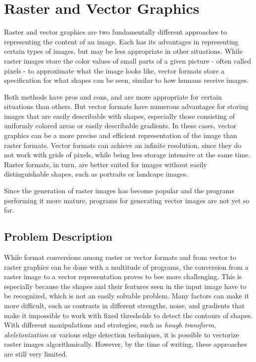 \documentclass[12pt, a4paper, titlepage]{report}
\begin{document}
\section{Raster and Vector Graphics}

Raster and vector graphics are two fundamentally different approaches to representing the content of an image. Each has its advantages in representing certain types of images, but may be less appropriate in other situations. While raster images store the color values of small parts of a given picture - often called pixels - to approximate what the image looks like, vector formats store a specification for what shapes can be seen, similar to how humans receive images.

Both methods have pros and cons, and are more appropriate for certain situations than others. But vector formats have numerous advantages for storing images that are easily describable with shapes, especially those consisting of uniformly colored areas or easily describable gradients. In these cases, vector graphics can be a more precise and efficient representation of the image than raster formats. Vector formats can achieve an infinite resolution, since they do not work with grids of pixels, while being less storage intensive at the same time. Raster formats, in turn, are better suited for images without easily distinguishable shapes, such as portraits or landcape images.

Since the generation of raster images has become popular and the programs performing it more mature, programs for generating vector images are not yet so far.

\subsection{Problem Description}

While format conversions among raster or vector formats and from vector to raster graphics can be done with a multitude of programs, the conversion from a raster image to a vector representation proves to bee more challenging. This is especially because the shapes and their features seen in the input image have to be recognized, which is not an easily solvable problem. Many factors can make it more difficult, such as contrasts in different strengths, noise, and gradients that make it impossible to work with fixed thresholds to detect the contours of shapes. With different manipulations and strategies, such as \emph{hough transform}, \emph{skeletonization} or various edge detection techniques, it is possible to vectorize raster images algorithmically. However, by the time of writing, these approaches are still very limited.
\end{document}

